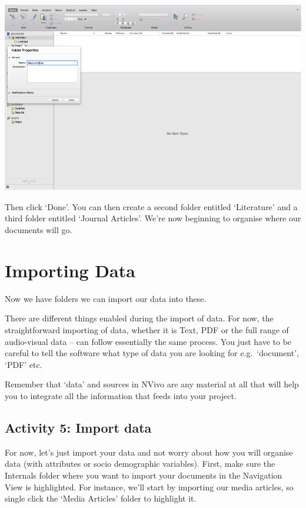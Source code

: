\documentclass[]{book}
\theoremstyle{definition}
\theoremstyle{definition}
\theoremstyle{definition}
\theoremstyle{remark}
\begin{document}
\includegraphics{imgs/qual_12.png}

Then click `Done'. You can then create a second folder entitled
`Literature' and a third folder entitled `Journal Articles'. We're now
beginning to organise where our documents will go.

\hypertarget{importing-data}{%
\section{Importing Data}\label{importing-data}}

Now we have folders we can import our data into these.

There are different things enabled during the import of data. For now,
the straightforward importing of data, whether it is Text, PDF or the
full range of audio-visual data -- can follow essentially the same
process. You just have to be careful to tell the software what type of
data you are looking for e.g.~`document', `PDF' etc.

Remember that `data' and sources in NVivo are any material at all that
will help you to integrate all the information that feeds into your
project.

\hypertarget{activity-5-import-data}{%
\subsection{Activity 5: Import data}\label{activity-5-import-data}}

For now, let's just import your data and not worry about how you will
organise data (with attributes or socio demographic variables). First,
make sure the Internals folder where you want to import your documents
in the Navigation View is highlighted. For instance, we'll start by
importing our media articles, so single click the `Media Articles'
folder to highlight it.
\end{document}

